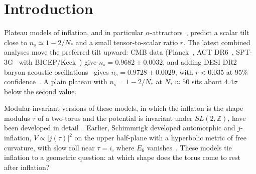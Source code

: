\documentclass[aps,prd,twocolumn,superscriptaddress,nofootinbib,floatfix]{revtex4-2}
\begin{document}
\begin{abstract}
fails and $\delta_{CP}\in\{0,\pi\}$, so a discovery of leptonic CP violation would exclude that version. The tilt at $i$ and $\rho$ is fitted, as is a small symmetry-breaking parameter of the $\rho$ lepton sector, and the plateau itself is placed in the nilpotent sector by choice, as in other $SL(2,\mathbb{Z})$ attractors; we find no string origin for its form. The inflationary predictions were frozen with public hashes and will be scored only on future CMB and large-scale-structure data.
\end{abstract}
\maketitle

\section{Introduction}
Plateau models of inflation, and in particular $\alpha$-attractors~\cite{arXiv_1306_5220}, predict a scalar tilt close to $n_s \simeq 1-2/N_*$ and a small tensor-to-scalar ratio $r$. The latest combined analyses move the preferred tilt upward: CMB data (Planck~\cite{Planck2018X}, ACT DR6~\cite{arXiv_2503_14452}, SPT-3G~\cite{arXiv_2506_20707} with BICEP/Keck~\cite{arXiv_2110_00483}) give $n_s = 0.9682 \pm 0.0032$, and adding DESI DR2 baryon acoustic oscillations~\cite{arXiv_2503_14738} gives $n_s = 0.9728 \pm 0.0029$, with $r < 0.035$ at 95\% confidence~\cite{arXiv_2512_10613}. A plain plateau with $n_s=1-2/N_*$ at $N_* \approx 50$ sits about $4.4\sigma$ below the second value.

Modular-invariant versions of these models, in which the inflaton is the shape modulus $\tau$ of a two-torus and the potential is invariant under $SL(2,\mathbb{Z})$, have been developed in detail~\cite{arXiv_2408_05203,arXiv_2412_19324,arXiv_2405_06497,arXiv_2407_12081,arXiv_2411_18603}. Earlier, Schimmrigk developed automorphic and $j$-inflation, $V\propto|j(\tau)|^2$ on the upper half-plane with a hyperbolic metric of free curvature, with slow roll near $\tau=i$, where $E_6$ vanishes~\cite{arXiv_1512_09082,arXiv_1612_09559}. These models tie inflation to a geometric question: at which shape does the torus come to rest after inflation?
\end{document}
